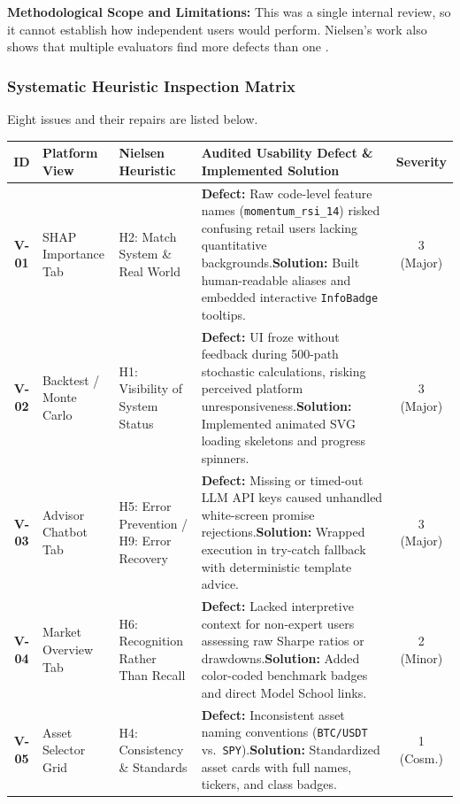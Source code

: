 \documentclass[11pt,a4paper]{article}
\begin{document}
\textbf{Methodological Scope and Limitations:}
This was a single internal review, so it cannot establish how independent users would perform. Nielsen's work also shows that multiple evaluators find more defects than one \cite{nielsen1994}.

\subsubsection{Systematic Heuristic Inspection Matrix}
Eight issues and their repairs are listed below.

\begin{table}[H]
\centering
\footnotesize
\renewcommand{\arraystretch}{0.90}
\begin{tabularx}{\textwidth}{c p{2.8cm} p{2.7cm} X c}
\toprule
\textbf{ID} & \textbf{Platform View} & \textbf{Nielsen Heuristic} & \textbf{Audited Usability Defect \& Implemented Solution} & \textbf{Severity} \\
\midrule
\textbf{V-01} & SHAP Importance Tab & H2: Match System \& Real World & \textbf{Defect:} Raw code-level feature names (\texttt{momentum\_rsi\_14}) risked confusing retail users lacking quantitative backgrounds.\newline \textbf{Solution:} Built human-readable aliases and embedded interactive \texttt{InfoBadge} tooltips. & 3 (Major) \\
\midrule
\textbf{V-02} & Backtest / Monte Carlo & H1: Visibility of System Status & \textbf{Defect:} UI froze without feedback during 500-path stochastic calculations, risking perceived platform unresponsiveness.\newline \textbf{Solution:} Implemented animated SVG loading skeletons and progress spinners. & 3 (Major) \\
\midrule
\textbf{V-03} & Advisor Chatbot Tab & H5: Error Prevention / H9: Error Recovery & \textbf{Defect:} Missing or timed-out LLM API keys caused unhandled white-screen promise rejections.\newline \textbf{Solution:} Wrapped execution in try-catch fallback with deterministic template advice. & 3 (Major) \\
\midrule
\textbf{V-04} & Market Overview Tab & H6: Recognition Rather Than Recall & \textbf{Defect:} Lacked interpretive context for non-expert users assessing raw Sharpe ratios or drawdowns.\newline \textbf{Solution:} Added color-coded benchmark badges and direct Model School links. & 2 (Minor) \\
\midrule
\textbf{V-05} & Asset Selector Grid & H4: Consistency \& Standards & \textbf{Defect:} Inconsistent asset naming conventions (\texttt{BTC/USDT} vs.\ \texttt{SPY}).\newline \textbf{Solution:} Standardized asset cards with full names, tickers, and class badges. & 1 (Cosm.) \\

\end{tabularx}
\end{table}
\end{document}
